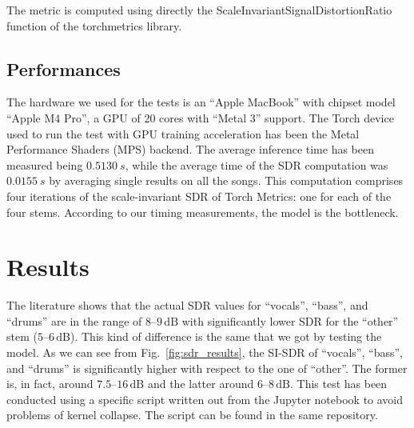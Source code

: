 \documentclass{article}
\begin{document}
\begin{sloppy}
The metric is computed using directly the ScaleInvariantSignalDistortionRatio \cite{torchmetrics_si_sdr_2025} function of the torchmetrics library.

\subsection{Performances}
\label{Performances}
The hardware we used for the tests is an ``Apple MacBook'' with chipset model ``Apple M4 Pro'', a GPU of 20 cores with ``Metal 3'' support. The Torch device used to run the test with GPU training acceleration has been the Metal Performance Shaders (MPS) backend. 
The average inference time has been measured being $0.5130~s$, while the average time of the SDR computation was $0.0155~s$ by averaging single results on all the songs. This computation comprises four iterations of the scale-invariant SDR of Torch Metrics: one for each of the four stems. According to our timing measurements, the model is the bottleneck.  %

\section{Results}
\label{sec:results}
The literature \cite{HybridDemucs, defossez2021hybrid} shows that the actual SDR values for ``vocals'', ``bass'', and ``drums'' are in the range of \( 8\text{–}9\,\mathrm{dB} \) with significantly lower SDR for the ``other'' stem (\(5\text{–}6\,\mathrm{dB} \)). This kind of difference is the same that we got by testing the model. As we can see from Fig.~\ref{fig:sdr_results}, the SI-SDR of ``vocals'', ``bass'', and ``drums'' is significantly higher with respect to the one of ``other''. The former is, in fact, around \( 7.5\text{–}16\,\mathrm{dB} \) and the latter around \( 6\text{–}8\,\mathrm{dB} \). This test has been conducted using a specific script written out from the Jupyter notebook to avoid problems of kernel collapse. The script can be found in the same repository. %



\end{sloppy}
\end{document}
